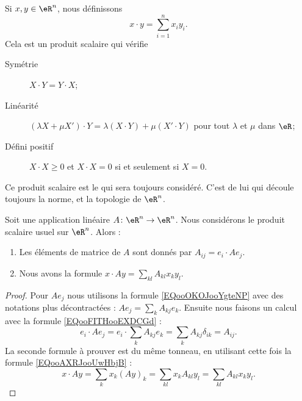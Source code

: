 \begin{proposition}     \label{PROPooSKVRooDGVCYj}
    Si \( x,y\in \eR^n\), nous définissons
    \begin{equation}        \label{EQooFITHooEXDCGd}
        x\cdot y=\sum_{i=1}^n x_iy_i.
    \end{equation}
    Cela est un produit scalaire qui vérifie
	\begin{description}
		\item[Symétrie] $X\cdot Y=Y\cdot X$;
		\item[Linéarité] $(\lambda X+\mu X')\cdot Y=\lambda(X\cdot Y)+\mu(X'\cdot Y)$ pour tout $\lambda$ et $\mu$ dans $\eR$;
		\item[Défini positif] $X\cdot X\geq 0$ et $X\cdot X=0$ si et seulement si $X=0$.
	\end{description}
    Ce produit scalaire est le  qui sera toujours considéré. C'est de lui qui découle toujours la norme, et la topologie de \( \eR^n\).
\end{proposition}

\begin{proposition}     \label{PROPooZKWXooWmEzoA}
    Soit une application linéaire \( A\colon \eR^n\to \eR^n\). Nous considérons le produit scalaire usuel sur \( \eR^n\). Alors :
    \begin{enumerate}
        \item
            Les éléments de matrice de \( A\) sont donnés par $A_{ij}=e_i\cdot Ae_j$.
        \item
            Nous avons la formule \( x\cdot Ay=\sum_{kl}A_{kl}x_ky_l \).
    \end{enumerate}
\end{proposition}

\begin{proof}
    Pour \( Ae_j\) nous utilisons la formule \ref{EQooOKOJooYgteNP} avec des notations plus décontractées : \( Ae_j=\sum_kA_{kj}e_k\). Ensuite nous faisons un calcul avec la formule \eqref{EQooFITHooEXDCGd} :
    \begin{equation}
        e_i\cdot Ae_j=e_i\cdot \sum_kA_{kj}e_k=\sum_{k}A_{kj}\delta_{ik}=A_{ij}.
    \end{equation}
    La seconde formule à prouver est du même tonneau, en utilisant cette fois la formule \eqref{EQooAXRJooUwHbjB} :
    \begin{equation}
        x\cdot Ay=\sum_kx_k(Ay)_k=\sum_{kl}x_kA_{kl}y_l=\sum_{kl}A_{kl}x_ky_l.
    \end{equation}
\end{proof}

